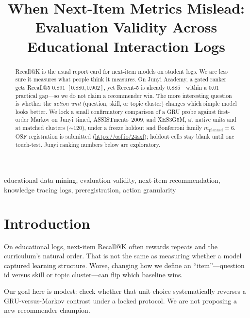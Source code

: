 \documentclass[conference,a4paper]{IEEEtran}
\begin{document}
\title{When Next-Item Metrics Mislead: Evaluation Validity Across Educational Interaction Logs}

\author{
}

\maketitle

\begin{abstract}
Recall@K is the usual report card for next-item models on student logs.
We are less sure it measures what people think it measures.
On Junyi Academy, a gated ranker gets Recall@5 $0.891$ $[0.880, 0.902]$, yet Recent-5 is already $0.885$---within a $0.01$ practical gap---so we do not claim a recommender win.
The more interesting question is whether the \emph{action unit} (question, skill, or topic cluster) changes which simple model looks better.
We lock a small confirmatory comparison of a GRU probe against first-order Markov on Junyi timed, ASSISTments~2009, and XES3G5M, at native units and at matched clusters ($\sim$120), under a freeze holdout and Bonferroni family $m_{\mathrm{planned}}=6$.
OSF registration is submitted (\url{https://osf.io/24sxf}); holdout cells stay blank until one touch-test. Junyi ranking numbers below are exploratory.
\end{abstract}

\begin{IEEEkeywords}
educational data mining, evaluation validity, next-item recommendation,
knowledge tracing logs, preregistration, action granularity
\end{IEEEkeywords}

\section{Introduction}
On educational logs, next-item Recall@K often rewards repeats and the curriculum's natural order.
That is not the same as measuring whether a model captured learning structure.
Worse, changing how we define an ``item''---question id versus skill or topic cluster---can flip which baseline wins.

Our goal here is modest: check whether that unit choice systematically reverses a GRU-versus-Markov contrast under a locked protocol.
We are not proposing a new recommender champion.
\end{document}
